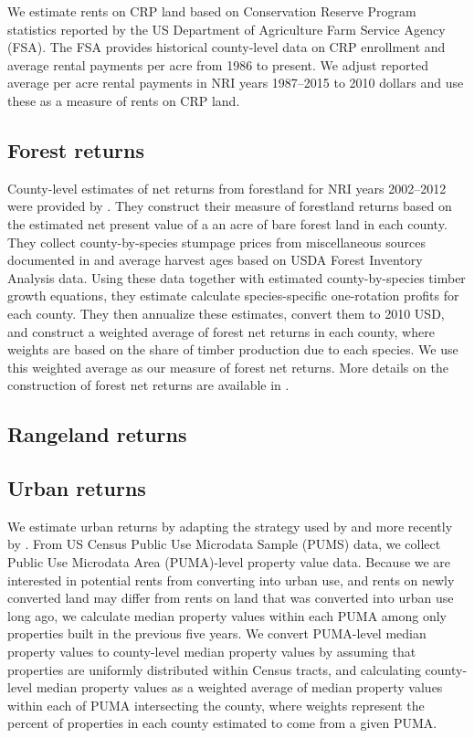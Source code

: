 \documentclass[11pt]{article}
\begin{document}
We estimate rents on CRP land based on Conservation Reserve Program statistics reported by the US Department of Agriculture Farm Service Agency (FSA). The FSA provides historical county-level data on CRP enrollment and average rental payments per acre from 1986 to present. We adjust reported average per acre rental payments in NRI years 1987--2015 to 2010 dollars and use these as a measure of rents on CRP land. 

\subsection{Forest returns}

County-level estimates of net returns from forestland for NRI years 2002--2012 were provided by \citet{mihiarlewis}. They construct their measure of forestland returns based on the estimated net present value of a an acre of bare forest land in each county. They collect county-by-species stumpage prices from miscellaneous sources documented in \citet{mihiar2017} and average harvest ages based on USDA Forest Inventory Analysis data. Using these data together with estimated county-by-species timber growth equations, they estimate calculate species-specific one-rotation profits for each county. They then annualize these estimates, convert them to 2010 USD, and construct a weighted average of forest net returns in each county, where weights are based on the share of timber production due to each species. We use this weighted average as our measure of forest net returns. More details on the construction of forest net returns are available in \citet{mihiarlewis}.

\subsection{Rangeland returns}


\subsection{Urban returns}

We estimate urban returns by adapting the strategy used by \citet{lubowski2006} and more recently by \citet{mihiarlewis}. From US Census Public Use Microdata Sample (PUMS) data, we collect Public Use Microdata Area (PUMA)-level property value data. Because we are interested in potential rents from converting into urban use, and rents on newly converted land may differ from rents on land that was converted into urban use long ago, we calculate median property values within each PUMA among only properties built in the previous five years. We convert PUMA-level median property values to county-level median property values by assuming that properties are uniformly distributed within Census tracts, and calculating county-level median property values as a weighted average of median property values within each of PUMA intersecting the county, where weights represent the percent of properties in each county estimated to come from a given PUMA. 
\end{document}
